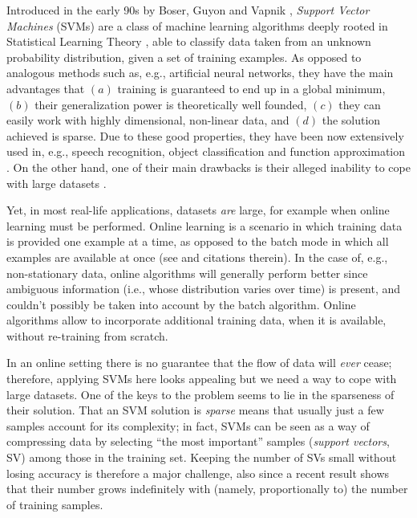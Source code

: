 Introduced in the early 90s by Boser, Guyon and Vapnik \cite{BGV92},
\emph{Support Vector Machines} (SVMs) are a class of machine learning
algorithms deeply rooted in Statistical Learning Theory
\cite{v-edbed-82}, able to classify data taken from an unknown
probability distribution, given a set of training examples. As opposed
to analogous methods such as, e.g., artificial neural networks, they
have the main advantages that $(a)$ training is guaranteed to end up
in a global minimum, $(b)$ their generalization power is theoretically
well founded, $(c)$ they can easily work with highly dimensional,
non-linear data, and $(d)$ the solution achieved is sparse. Due to
these good properties, they have been now extensively used in, e.g.,
speech recognition, object classification and function approximation
\cite{Cristianini00}. On the other hand, one of their main drawbacks
is their alleged inability to cope with large datasets
\cite{KeerthiCDC06}.

Yet, in most real-life applications, datasets \emph{are} large, for
example when online learning must be performed. Online learning is a
scenario in which training data is provided one example at a time, as
opposed to the batch mode in which all examples are available at once
(see \cite{Laskov2006} and citations therein). In the case of, e.g.,
non-stationary data, online algorithms will generally perform better
since ambiguous information (i.e., whose distribution varies over
time) is present, and couldn't possibly be taken into account by the
batch algorithm. Online algorithms allow to incorporate additional
training data, when it is available, without re-training from scratch.

In an online setting there is no guarantee that the flow of data will
\emph{ever} cease; therefore, applying SVMs here looks appealing but
we need a way to cope with large datasets. One of the keys to the
problem seems to lie in  the sparseness of their solution. That an
SVM solution is \emph{sparse} means that usually just a few samples
account for its complexity; in fact, SVMs can be seen as a way of
compressing data by selecting ``the most important'' samples
(\emph{support vectors}, SV) among those in the training set. Keeping
the number of SVs small without losing accuracy is therefore a major
challenge, also since a recent result \cite{Steinwart03} shows that
their number grows indefinitely with (namely, proportionally to) the
number of training samples.

